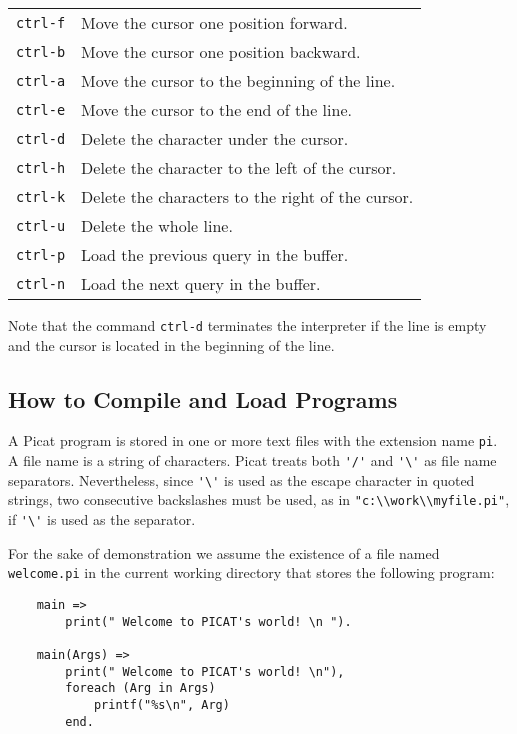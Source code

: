 \begin{tabular}{ll}
\verb+ctrl-f+ & Move the cursor one position forward. \\
\verb+ctrl-b+ & Move the cursor one position backward. \\
\verb+ctrl-a+ & Move the cursor to the beginning of the line. \\
\verb+ctrl-e+ & Move the cursor to the end of the line.  \\
\verb+ctrl-d+ & Delete the character under the cursor.  \\
\verb+ctrl-h+ & Delete the character to the left of the cursor.  \\
\verb+ctrl-k+ & Delete the characters to the right of the cursor. \\
\verb+ctrl-u+ & Delete the whole line.  \\
\verb+ctrl-p+ & Load the previous query in the buffer.  \\
\verb+ctrl-n+ & Load the next query in the buffer.
\end{tabular}

\noindent
Note that the command \verb+ctrl-d+ terminates the interpreter if the line is empty and the cursor is located in the beginning of the line.

\subsection{How to Compile and Load Programs}
A Picat program is stored in one or more text files with the extension name \texttt{pi}. A file name is a string of characters. Picat treats both  \verb+'/'+ and \verb+'\'+ as file name separators. Nevertheless, since \verb+'\'+ is used as the escape character in quoted strings, two consecutive backslashes must be used, as in \verb+"c:\\work\\myfile.pi"+, if \verb+'\'+ is used as the separator.

For the sake of demonstration we assume the existence of a file named \texttt{welcome.pi} in the current working directory that stores the following program:
\begin{verbatim}
    main =>
        print(" Welcome to PICAT's world! \n ").

    main(Args) =>
        print(" Welcome to PICAT's world! \n"),
        foreach (Arg in Args)
            printf("%s\n", Arg)
        end.
\end{verbatim}

